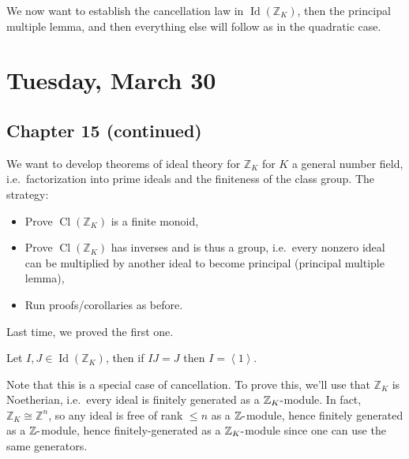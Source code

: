 \begin{remark}

We now want to establish the cancellation law in
\(\operatorname{Id}({\mathbb{Z}}_K)\), then the principal multiple
lemma, and then everything else will follow as in the quadratic case.

\end{remark}

\hypertarget{tuesday-march-30}{%
\section{Tuesday, March 30}\label{tuesday-march-30}}

\hypertarget{chapter-15-continued}{%
\subsection{Chapter 15 (continued)}\label{chapter-15-continued}}

\begin{remark}

We want to develop theorems of ideal theory for \({\mathbb{Z}}_K\) for
\(K\) a general number field, i.e.~factorization into prime ideals and
the finiteness of the class group. The strategy:

\begin{itemize}
\tightlist
\item
  Prove \(\operatorname{Cl}({\mathbb{Z}}_K)\) is a finite monoid,
\item
  Prove \(\operatorname{Cl}({\mathbb{Z}}_K)\) has inverses and is thus a
  group, i.e.~every nonzero ideal can be multiplied by another ideal to
  become principal (principal multiple lemma),
\item
  Run proofs/corollaries as before.
\end{itemize}

Last time, we proved the first one.

\end{remark}

\begin{lemma}[?]

Let \(I, J \in \operatorname{Id}({\mathbb{Z}}_K)\), then if \(IJ = J\)
then \(I = \left\langle{ 1 }\right\rangle\).

\end{lemma}

\begin{remark}

Note that this is a special case of cancellation. To prove this, we'll
use that \({\mathbb{Z}}_K\) is Noetherian, i.e.~every ideal is finitely
generated as a \({\mathbb{Z}}_K{\hbox{-}}\)module. In fact,
\({\mathbb{Z}}_K \cong {\mathbb{Z}}^n\), so any ideal is free of rank
\(\leq n\) as a \({\mathbb{Z}}{\hbox{-}}\)module, hence finitely
generated as a \({\mathbb{Z}}{\hbox{-}}\)module, hence
finitely-generated as a \({\mathbb{Z}}_K{\hbox{-}}\)module since one can
use the same generators.

\end{remark}

